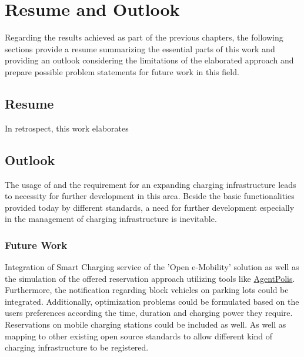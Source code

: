 

\chapter{Resume and Outlook}
\label{ch:Resume and Outlook}

Regarding the results achieved as part of the previous chapters, the following sections provide a resume summarizing the essential parts of this work and providing an outlook considering the limitations of the elaborated approach and prepare possible problem statements for future work in this field.

\section{Resume}
\label{ch:Resume and Outlook:sec:Resume}

In retrospect, this work elaborates

\section{Outlook}
\label{ch:Resume and Outlook:sec:Outlook}

The usage of  and the requirement for an expanding charging infrastructure leads to necessity for further development in this area. Beside the basic functionalities provided today by different standards, a need for further development especially in the management of charging infrastructure is inevitable. 

\subsection{Future Work}
\label{ch:Resume and Outlook:sec:Outlook:ssec:Future Work}

Integration of Smart Charging service of the 'Open e-Mobility' solution as well as the simulation of the offered reservation approach utilizing tools like \href{https://github.com/aicenter/agentpolis}{AgentPolis}.
Furthermore, the notification regarding block vehicles on  parking lots could be integrated.
Additionally, optimization problems could be formulated based on the users preferences according the time, duration and charging power they require.
Reservations on mobile charging stations could be included as well.
As well as mapping to other existing open source standards to allow different kind of charging infrastructure to be registered.